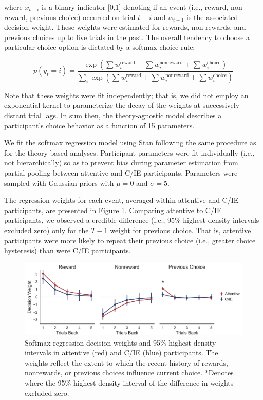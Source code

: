 \documentclass[a4paper,notitlepage,12pt]{article}
\begin{document}
where $x_{t-i}$ is a binary indicator [0,1] denoting if an event (i.e., reward, non-reward, previous choice) occurred on trial $t-i$ and $w_{t-1}$ is the associated decision weight. These weights were estimated for rewards, non-rewards, and previous choices up to five trials in the past. The overall tendency to choose a particular choice option is dictated by a softmax choice rule:

\begin{equation*}
    p(y_t = i) = \frac{ \exp \left( \sum w_i^\text{reward} + \sum w_i^\text{nonreward} + \sum w_i^\text{choice} \right) }{ \sum_i \exp \left( \sum w_i^\text{reward} + \sum w_i^\text{nonreward} + \sum w_i^\text{choice} \right) }
\end{equation*}

Note that these weights were fit independently; that is, we did not employ an exponential kernel to parameterize the decay of the weights at successively distant trial lags. In sum then, the theory-agnostic model describes a participant's choice behavior as a function of 15 parameters. 

We fit the softmax regression model using Stan following the same procedure as for the theory-based analyses. Participant parameters were fit individually (i.e., not hierarchically)  so as to prevent bias during parameter estimation from partial-pooling between attentive and C/IE participants. Parameters were sampled with Gaussian priors with $\mu = 0$ and $\sigma = 5$.

The regression weights for each event, averaged within attentive and C/IE participants, are presented in Figure \ref{fig:regression}. Comparing attentive to C/IE participants, we observed a credible difference (i.e., 95\% highest density intervals excluded zero) only for the $T-1$ weight for previous choice. That is, attentive participants were more likely to repeat their previous choice (i.e., greater choice hysteresis) than were C/IE participants.

\begin{figure}[!t]
    \includegraphics[width=16cm]{../figures/main_03c.png}
    \centering
    \caption{Softmax regression decision weights and 95\% highest density intervals in attentive (red) and C/IE (blue) participants. The weights reflect the extent to which the recent history of rewards, nonrewards, or previous choices influence current choice. *Denotes where the 95\% highest density interval of the difference in weights excluded zero.}
    \label{fig:regression}
\end{figure}
\end{document}
